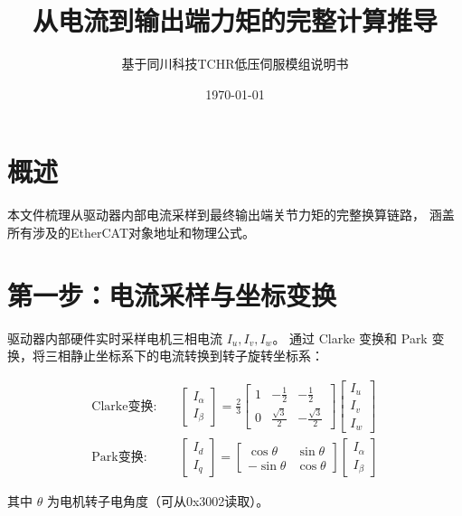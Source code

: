 \documentclass[12pt,a4paper]{article}
\title{从电流到输出端力矩的完整计算推导}
\author{基于同川科技TCHR低压伺服模组说明书}
\date{\today}
\begin{document}
\maketitle

\section{概述}

本文件梳理从驱动器内部电流采样到最终输出端关节力矩的完整换算链路，
涵盖所有涉及的EtherCAT对象地址和物理公式。

\section{第一步：电流采样与坐标变换}

驱动器内部硬件实时采样电机三相电流 \(I_u, I_v, I_w\)。
通过 Clarke 变换和 Park 变换，将三相静止坐标系下的电流转换到转子旋转坐标系：

\begin{equation}
\begin{aligned}
\text{Clarke变换:}&\quad
\begin{bmatrix}
I_\alpha \\ I_\beta
\end{bmatrix}
=
\frac{2}{3}
\begin{bmatrix}
1 & -\frac{1}{2} & -\frac{1}{2} \\
0 & \frac{\sqrt{3}}{2} & -\frac{\sqrt{3}}{2}
\end{bmatrix}
\begin{bmatrix}
I_u \\ I_v \\ I_w
\end{bmatrix}
\\[8pt]
\text{Park变换:}&\quad
\begin{bmatrix}
I_d \\ I_q
\end{bmatrix}
=
\begin{bmatrix}
\cos\theta & \sin\theta \\
-\sin\theta & \cos\theta
\end{bmatrix}
\begin{bmatrix}
I_\alpha \\ I_\beta
\end{bmatrix}
\end{aligned}
\end{equation}

其中 \(\theta\) 为电机转子电角度（可从0x3002读取）。
\end{document}
